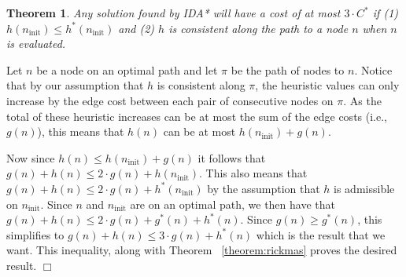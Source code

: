 \documentclass[letterpaper]{article}
\newtheorem{theorem}{Theorem}
\newenvironment{proof}{\par\noindent{\em Proof.}}{\hfill $\Box$\medskip}
\begin{document}
\begin{theorem}
Any solution found by IDA* will have a cost of at most $3 \cdot C^*$ if (1) $h(n_{\mathrm{init}}) \leq h^*(n_{\mathrm{init}})$ and (2) $h$ is consistent along the path to a node $n$ when $n$ is evaluated.
\label{the:h_increase_policy}
\end{theorem}
\begin{proof}
%
Let $n$ be a node on an optimal path %
and let $\pi$ be the path of nodes to $n$.
Notice that by our assumption that $h$ is consistent along $\pi$, the heuristic values can only increase by the edge cost between each pair of consecutive nodes on $\pi$.
As the total of these heuristic increases can be at most the sum of the edge costs (i.e., $g(n)$), this means that $h(n)$ can be at most $h(n_{\mathrm{init}}) + g(n)$.

Now since $h(n) \leq h(n_{\mathrm{init}}) + g(n)$ it follows that $g(n) + h(n) \leq 2 \cdot g(n) + h(n_{\mathrm{init}})$. This also means that $g(n) + h(n) \leq 2 \cdot g(n) + h^*(n_{\mathrm{init}})$ by the assumption that $h$ is admissible on $n_{\mathrm{init}}$.
Since $n$ and $n_{\mathrm{init}}$ are on an optimal path, we then have that $g(n) + h(n) \leq 2 \cdot g(n) + g^*(n) + h^*(n)$.
Since $g(n) \geq g^*(n)$, this simplifies to $g(n) + h(n) \leq 3 \cdot g(n) + h^*(n)$ which is the result that we want. This inequality, along with Theorem 
~\ref{theorem:rickmas} 
proves the desired result.
\end{proof}
\end{document}
